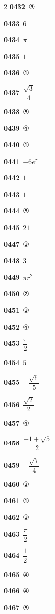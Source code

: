 \documentclass[10pt,a4paper]{article}
\begin{document}
\begin{multicols}{2}
\noindent\textbf{0432}\ ③\par
\noindent\textbf{0433}\ $6$\par
\noindent\textbf{0434}\ $\pi$\par
\noindent\textbf{0435}\ $1$\par
\noindent\textbf{0436}\ ①\par
\noindent\textbf{0437}\ $\dfrac{\sqrt{3}}{4}$\par
\noindent\textbf{0438}\ ⑤\par
\noindent\textbf{0439}\ ④\par
\noindent\textbf{0440}\ ①\par
\noindent\textbf{0441}\ $-6e^{\pi}$\par
\noindent\textbf{0442}\ $1$\par
\noindent\textbf{0443}\ $1$\par
\noindent\textbf{0444}\ ⑤\par
\noindent\textbf{0445}\ $21$\par
\noindent\textbf{0447}\ ③\par
\noindent\textbf{0448}\ $3$\par
\noindent\textbf{0449}\ $\pi r^2$\par
\noindent\textbf{0450}\ ②\par
\noindent\textbf{0451}\ ③\par
\noindent\textbf{0452}\ ④\par
\noindent\textbf{0453}\ $\dfrac{\pi}{2}$\par
\noindent\textbf{0454}\ $5$\par
\noindent\textbf{0455}\ $-\dfrac{\sqrt{5}}{5}$\par
\noindent\textbf{0456}\ $\dfrac{\sqrt{2}}{2}$\par
\noindent\textbf{0457}\ ④\par
\noindent\textbf{0458}\ $\dfrac{-1+\sqrt{5}}{2}$\par
\noindent\textbf{0459}\ $-\dfrac{\sqrt{7}}{4}$\par
\noindent\textbf{0460}\ ②\par
\noindent\textbf{0461}\ ①\par
\noindent\textbf{0462}\ ③\par
\noindent\textbf{0463}\ $\dfrac{\pi}{2}$\par
\noindent\textbf{0464}\ $\dfrac{1}{2}$\par
\noindent\textbf{0465}\ ④\par
\noindent\textbf{0466}\ ④\par
\noindent\textbf{0467}\ ⑤\par

\end{multicols}
\end{document}
